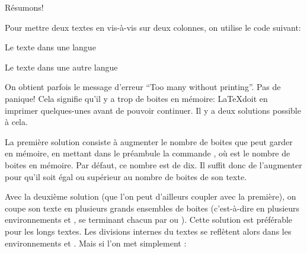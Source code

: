 \bigbreak

Résumons!

Pour mettre deux textes en vis-à-vis sur deux colonnes, on utilise le code suivant: 

\begin{latexcode}

\begin{pages}  %
\begin{Leftside} %
 \beginnumbering %
 \pstart %
 
Le texte dans une langue 
 
 \pend
 \endnumbering  %
 \end{Leftside} %
 
 \begin{Rightside}  %
 \beginnumbering
 \pstart
 
 Le texte dans une autre langue
 
 \pend
 \endnumbering
 \end{Rightside} 
 \Pages

  \end{pages} %
\end{latexcode}


On obtient parfois le message d'erreur \enquote{Too many  without printing}. Pas de panique! Cela signifie qu'il y a trop de boites en mémoire: \LaTeX  doit en imprimer quelques-unes avant de pouvoir continuer.  Il y a deux solutions possible à cela.

La première solution consiste à  augmenter le nombre de boites que  peut garder en mémoire, en mettant dans le préambule la commande , où  est le nombre de boites en mémoire. Par défaut, ce nombre est de dix. Il suffit donc de l'augmenter  pour qu'il soit égal ou supérieur au nombre de boites de son  texte.


Avec la deuxième solution (que l'on peut d'ailleurs coupler avec la première), on  coupe son texte en plusieurs grands ensembles de boites (c'est-à-dire en plusieurs environnements  et , se terminant chacun par  ou ).  Cette solution est préférable pour les longs textes. Les divisions internes du textes se reflètent alors dans les environnements  et .   Mais si l'on met simplement :

